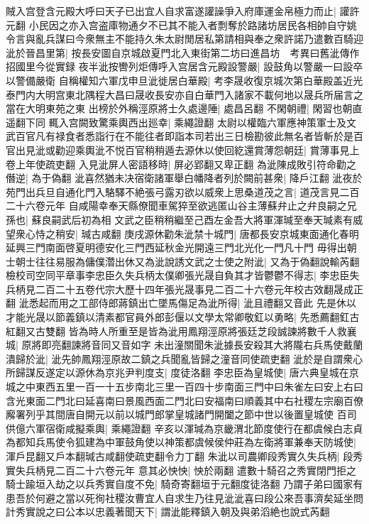賊入宫登含元殿大呼曰天子已出宜人自求富遂讙譟爭入府庫運金帛極力而止|{
	讙許元翻}
小民因之亦入宫盗庫物通夕不已其不能入者剽奪於路諸坊居民各相帥自守姚令言與亂兵謀曰今衆無主不能持久朱太尉閒居私第請相與奉之衆許諾乃遣數百騎迎泚於晉昌里第|{
	按長安圖自京城啟夏門北入東街第二坊曰進昌坊　考異曰舊泚傳作招國里今從實録}
夜半泚按轡列炬傳呼入宫居含元殿設警嚴|{
	設鼓角以警嚴一曰設卒以警備嚴衛}
自稱權知六軍戊申旦泚徙居白華殿|{
	考李晟收復京城次第白華殿盖近光泰門内大明宫東北隅程大昌曰晟收長安亦自白華門入諸家不載何地以晟兵所届言之當在大明東苑之東}
出榜於外稱涇原將士久處邊陲|{
	處昌呂翻}
不閑朝禮|{
	閑習也朝直遥翻下同}
輒入宫闕致驚乘輿西出廵幸|{
	乘繩證翻}
太尉以權臨六軍應神策軍士及文武百官凡有禄食者悉詣行在不能往者即詣本司若出三日檢勘彼此無名者皆斬於是百官出見泚或勸迎乘輿泚不悦百官稍稍遁去源休以使回紇還賞薄怨朝廷|{
	賞薄事見上卷上年使疏吏翻}
入見泚屏人密語移時|{
	屏必郢翻又卑正翻}
為泚陳成敗引符命勸之僭逆|{
	為于偽翻}
泚喜然猶未决宿衛諸軍舉白幡降者列於闕前甚衆|{
	降戶江翻}
泚夜於苑門出兵旦自通化門入駱驛不絶張弓露刃欲以威衆上思桑道茂之言|{
	道茂言見二百二十六卷元年}
自咸陽幸奉天縣僚聞車駕猝至欲逃匿山谷主薄蘇弁止之弁良嗣之兄孫也|{
	蘇良嗣武后初為相}
文武之臣稍稍繼至己酉左金吾大將軍渾瑊至奉天瑊素有威望衆心恃之稍安|{
	瑊古咸翻}
庚戌源休勸朱泚禁十城門|{
	唐都長安京城東面通化春明延興三門南面啓夏明德安化三門西延秋金光開遠三門北光化一門凡十門}
毋得出朝士朝士往往易服為傭僕濳出休又為泚說誘文武之士使之附泚|{
	又為于偽翻說輸芮翻}
檢校司空同平章事李忠臣久失兵柄太僕卿張光晟自負其才皆鬱鬱不得志|{
	李忠臣失兵柄見二百二十五卷代宗大歷十四年張光晟事見二百二十六卷元年校古效翻晟成正翻}
泚悉起而用之工部侍郎蔣鎮出亡墜馬傷足為泚所得|{
	泚且禮翻又音此}
先是休以才能光晟以節義鎮以清素都官員外郎彭偃以文學太常卿敬釭以勇略|{
	先悉薦翻釭古紅翻又古雙翻}
皆為時人所重至是皆為泚用鳳翔涇原將張廷芝段誠諫將數千人救襄城|{
	原將即亮翻諫將音同又音如字}
未出潼關聞朱泚據長安殺其大將隴右兵馬使戴蘭潰歸於泚|{
	泚先帥鳳翔涇原故二鎮之兵聞亂皆歸之潼音同使疏吏翻}
泚於是自謂衆心所歸謀反遂定以源休為京兆尹判度支|{
	度徒洛翻}
李忠臣為皇城使|{
	唐六典皇城在京城之中東西五里一百一十五步南北三里一百四十步南面三門中曰朱雀左曰安上右曰含光東面二門北曰延喜南曰景風西面二門北曰安福南曰順義其中右社稷左宗廟百僚廨署列乎其間唐自開元以前以城門郎掌皇城諸門開闔之節中世以後置皇城使}
百司供億六軍宿衛咸擬乘輿|{
	乘繩證翻}
辛亥以渾瑊為京畿渭北節度使行在都虞候白志貞為都知兵馬使令狐建為中軍鼓角使以神策都虞候侯仲莊為左衛將軍兼奉天防城使|{
	渾戶昆翻又戶本翻瑊古咸翻使疏吏翻令力丁翻}
朱泚以司農卿段秀實久失兵柄|{
	段秀實失兵柄見二百二十六卷元年}
意其必怏怏|{
	怏於兩翻}
遣數十騎召之秀實閉門拒之騎士踰垣入劫之以兵秀實自度不免|{
	騎奇寄翻垣于元翻度徒洛翻}
乃謂子弟曰國家有患吾於何避之當以死徇社稷汝曹宜人自求生乃往見泚泚喜曰段公來吾事濟矣延坐問計秀實說之曰公本以忠義著聞天下|{
	謂泚能釋鎮入朝及與弟滔絶也說式芮翻}
